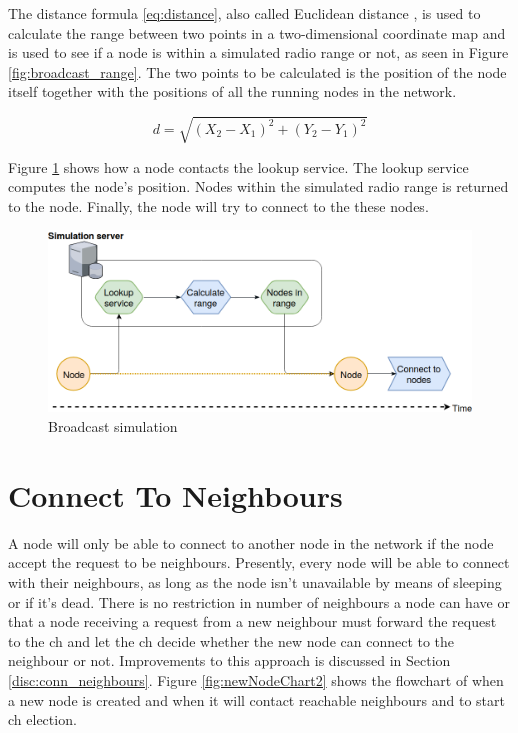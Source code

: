 \documentclass[USenglish]{uit-thesis}
\begin{document}
The distance formula \ref{eq:distance}, also called Euclidean distance \cite{euclidean}, is used to calculate the range between two points in a two-dimensional coordinate map and is used to see if a node is within a simulated radio range or not, as seen in Figure \ref{fig:broadcast_range}. The two points to be calculated is the position of the node itself together with the positions of all the running nodes in the network.

\begin{equation} \label{eq:distance}
d = \sqrt{(X_{2} - X_{1})^{2}+(Y_{2} - Y_{1})^{2}}
\end{equation}

\newpage

Figure \ref{fig:broadcast_simulation} shows how a node contacts the lookup service. The lookup service computes the node's position. Nodes within the simulated radio range is returned to the node. Finally, the node will try to connect to the these nodes.

\begin{figure} %
\centering
\includegraphics[width=\textwidth]{broadcast_simulation_kopi.png}
\caption{Broadcast simulation}
\label{fig:broadcast_simulation}
\end{figure}

\section{Connect To Neighbours}
A node will only be able to connect to another node in the network if the node accept the request to be neighbours. Presently, every node will be able to connect with their neighbours, as long as the node isn't unavailable by means of sleeping or if it's dead. There is no restriction in number of neighbours a node can have or that a node receiving a request from a new neighbour must forward the request to the \gls{ch} and let the \gls{ch} decide whether the new node can connect to the neighbour or not. Improvements to this approach is discussed in Section \ref{disc:conn_neighbours}. Figure \ref{fig:newNodeChart2} shows the flowchart of when a new node is created and when it will contact reachable neighbours and to start \gls{ch} election.
\end{document}
